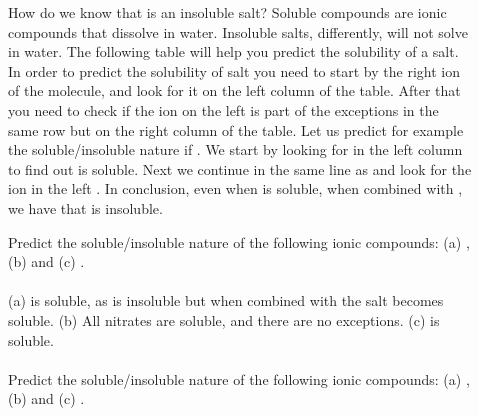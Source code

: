 \documentclass[main.tex]{subfiles}
\begin{document}
\begin{description}
\item[] How do we know that  is an insoluble salt? Soluble compounds are ionic compounds that dissolve in water. Insoluble salts, differently, will not solve in water. The following table will help you predict the solubility of a salt. In order to predict the solubility of salt you need to start by the right ion of the molecule, and look for it on the left column of the table. After that you need to check if the ion on the left is part of the exceptions in the same row but on the right column of the table. Let us predict for example the soluble/insoluble nature if . We start by looking for  in the left column to find out is soluble. Next we continue in the same line as  and look for the ion in the left . In conclusion, even when   is soluble, when combined with , we have that  is insoluble.




\begin{example} %
Predict the soluble/insoluble nature of the following ionic compounds: (a) , (b)  and (c) .
\\
\\
(a)  is soluble, as  is insoluble but when combined with  the salt becomes soluble. (b) All nitrates are soluble, and there are no exceptions. (c)  is soluble.
\\
\faDiamond\ \\
Predict the soluble/insoluble nature of the following ionic compounds: (a) , (b)  and (c) .
  \\
\end{example}%




\end{description}
\end{document}
